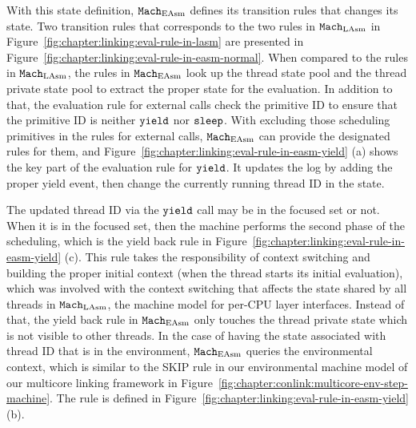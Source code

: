 With this state definition, ${\mathrm{\texttt{Mach}}}_{\mathrm{EAsm}}$ defines its transition rules that changes its state. 
Two transition rules that corresponds to the two rules in ${\mathrm{\texttt{Mach}}}_{\mathrm{LAsm}}$ in Figure~\ref{fig:chapter:linking:eval-rule-in-lasm}
are presented in Figure~\ref{fig:chapter:linking:eval-rule-in-easm-normal}.
When compared to the rules in ${\mathrm{\texttt{Mach}}}_{\mathrm{LAsm}}$,
the rules in ${\mathrm{\texttt{Mach}}}_{\mathrm{EAsm}}$ look up the thread state pool and the thread private state pool 
to extract the proper state for the evaluation.
In addition to that, the evaluation rule for external calls check the primitive ID to ensure that 
the primitive ID is neither ${\mathrm{\texttt{yield}}}$ nor ${\mathrm{\texttt{sleep}}}$. 
With excluding those scheduling primitives in the rules for external calls, 
${\mathrm{\texttt{Mach}}}_{\mathrm{EAsm}}$ can provide the designated rules for them, and 
Figure~\ref{fig:chapter:linking:eval-rule-in-easm-yield} (a) shows
the key part of the evaluation rule for ${\mathrm{\texttt{yield}}}$. 
It updates the log by adding the proper yield event, then 
change the currently running thread ID in the state. 

The updated thread ID via the ${\mathrm{\texttt{yield}}}$ call may be in the focused set or not. 
When it is in the focused set, 
then the machine performs the second phase of the scheduling, 
which is the yield back rule in Figure~\ref{fig:chapter:linking:eval-rule-in-easm-yield} (c).
This rule takes the responsibility of context switching 
and building the proper initial context (when the thread starts its initial evaluation),
which was involved with the context switching that affects the state shared by all threads in ${\mathrm{\texttt{Mach}}}_{\mathrm{LAsm}}$, the machine model for per-CPU layer interfaces. 
Instead of that,
the yield back rule in ${\mathrm{\texttt{Mach}}}_{\mathrm{EAsm}}$ only touches the thread private state which is not visible to other threads.
In the case of having the state associated with thread ID that is in the environment,
${\mathrm{\texttt{Mach}}}_{\mathrm{EAsm}}$ queries the environmental context, which is similar to the \textsf{SKIP} rule in our environmental machine model of our multicore linking framework in Figure~\ref{fig:chapter:conlink:multicore-env-step-machine}. 
The rule is defined in Figure~\ref{fig:chapter:linking:eval-rule-in-easm-yield} (b).


